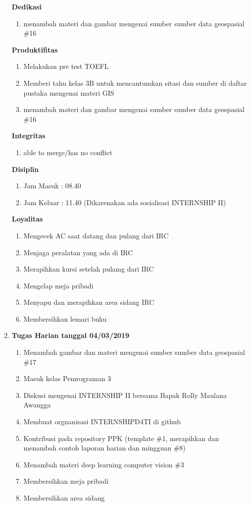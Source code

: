 \begin{enumerate}
\textbf{Dedikasi}
\begin{enumerate}
\item menambah materi dan gambar mengenai sumber sumber data geospasial \#16
\end{enumerate}

\textbf{Produktifitas}
\begin{enumerate}
\item Melakukan pre test TOEFL 
\item Memberi tahu kelas 3B untuk mencantumkan sitasi dan sumber di daftar pustaka mengenai materi GIS
\item menambah materi dan gambar mengenai sumber sumber data geospasial \#16
\end{enumerate}

\textbf{Integritas}
\begin{enumerate}
\item able to merge/has no conflict
\end{enumerate}


\textbf{Disiplin}
\begin{enumerate}
\item Jam Masuk : 08.40
\item Jam Keluar : 11.40 (Dikarenakan ada sosialisasi INTERNSHIP II)
\end{enumerate}


\textbf{Loyalitas}
\begin{enumerate}
\item Mengecek AC saat datang dan pulang dari IRC
\item Menjaga peralatan yang ada di IRC
\item Merapihkan kursi setelah pulamg dari IRC
\item Mengelap meja pribadi
\item Menyapu dan merapihkan area sidang IRC
\item Membersihkan lemari buku 
\end{enumerate}

\item \textbf{Tugas Harian tanggal 04/03/2019}
\begin{enumerate}
\item Menambah gambar dan materi mengenai sumber sumber data geospasial \#17
\item Masuk kelas Pemrograman 3 
\item Diskusi mengenai INTERNSHIP II bersama Bapak Rolly Maulana Awangga
\item Membuat orgnanisasi INTERNSHIPD4TI di github
\item Kontribusi pada repository PPK (template \#1, merapihkan dan menambah contoh laporan harian dan mingguan \#8)
\item Menambah materi deep learning computer vision \#3
\item Membersihkan meja pribadi
\item Membersihkan area sidang 
\end{enumerate}


\end{enumerate}

